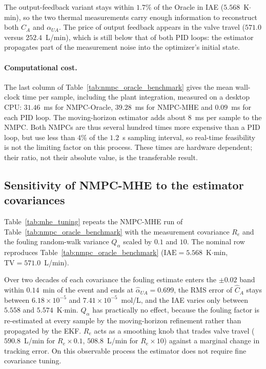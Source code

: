 The output-feedback variant stays within $1.7\%$ of the Oracle in IAE ($5.568$~K$\cdot$min), so the two thermal measurements carry enough information to reconstruct both $C_A$ and $\alpha_{UA}$. The price of output feedback appears in the valve travel ($571.0$ versus $252.4$~L/min), which is still below that of both PID loops: the estimator propagates part of the measurement noise into the optimizer's initial state.

\paragraph{Computational cost.} The last column of Table~\ref{tab:nmpc_oracle_benchmark} gives the mean wall-clock time per sample, including the plant integration, measured on a desktop CPU: $31.46$~ms for NMPC-Oracle, $39.28$~ms for NMPC-MHE and $0.09$~ms for each PID loop. The moving-horizon estimator adds about $8$~ms per sample to the NMPC. Both NMPCs are thus several hundred times more expensive than a PID loop, but use less than $4\%$ of the $1.2$~s sampling interval, so real-time feasibility is not the limiting factor on this process. These times are hardware dependent; their ratio, not their absolute value, is the transferable result.

\subsection{Sensitivity of NMPC-MHE to the estimator covariances}
\label{subsec:mhe_tuning}
Table~\ref{tab:mhe_tuning} repeats the NMPC-MHE run of Table~\ref{tab:nmpc_oracle_benchmark} with the measurement covariance $R_e$ and the fouling random-walk variance $Q_\alpha$ scaled by $0.1$ and $10$. The nominal row reproduces Table~\ref{tab:nmpc_oracle_benchmark} ($\mathrm{IAE} = 5.568$~K$\cdot$min, $\mathrm{TV} = 571.0$~L/min).



Over two decades of each covariance the fouling estimate enters the $\pm 0.02$ band within $0.14$~min of the event and ends at $\hat\alpha_{UA} = 0.699$, the RMS error of $\hat C_A$ stays between $6.18 \times 10^{-5}$ and $7.41 \times 10^{-5}$~mol/L, and the IAE varies only between $5.558$ and $5.574$~K$\cdot$min. $Q_\alpha$ has practically no effect, because the fouling factor is re-estimated at every sample by the moving-horizon refinement rather than propagated by the EKF. $R_e$ acts as a smoothing knob that trades valve travel ($590.8$~L/min for $R_e \times 0.1$, $508.8$~L/min for $R_e \times 10$) against a marginal change in tracking error. On this observable process the estimator does not require fine covariance tuning.

